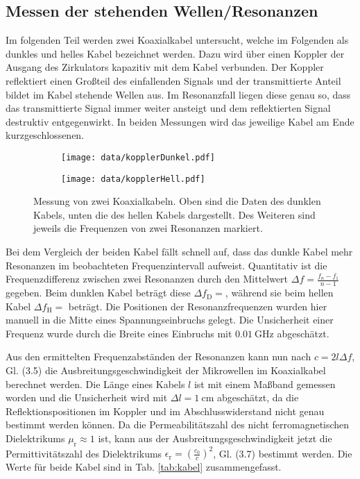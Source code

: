\subsection{Messen der stehenden Wellen/Resonanzen}
	Im folgenden Teil werden zwei Koaxialkabel untersucht, welche im Folgenden als dunkles und helles Kabel bezeichnet werden.
	Dazu wird über einen Koppler der Ausgang des Zirkulators kapazitiv mit dem Kabel verbunden.
	Der Koppler reflektiert einen Großteil des einfallenden Signals und der transmittierte Anteil bildet im Kabel stehende Wellen aus.
	Im Resonanzfall liegen diese genau so, dass das transmittierte Signal immer weiter ansteigt und dem reflektierten Signal destruktiv entgegenwirkt.
	In beiden Messungen wird das jeweilige Kabel am Ende kurzgeschlossenen.
	
	\begin{figure}[H]
		\centering
		\begin{subfigure}[c]{\textwidth}		
			\centering	
			\texttt{[image: data/kopplerDunkel.pdf]}
			\subcaption{}		
		\end{subfigure}
		
		\begin{subfigure}[c]{\textwidth}
			\centering
			\texttt{[image: data/kopplerHell.pdf]}
			\subcaption{}
		\end{subfigure}
		
		\caption{Messung von zwei Koaxialkabeln. Oben sind die Daten des dunklen Kabels, unten die des hellen Kabels dargestellt. Des Weiteren sind jeweils die Frequenzen von zwei Resonanzen markiert.}
		\label{fig:resonanz}
	\end{figure}

	Bei dem Vergleich der beiden Kabel fällt schnell auf, dass das dunkle Kabel mehr Resonanzen im beobachteten Frequenzintervall aufweist.
	Quantitativ ist die Frequenzdifferenz zwischen zwei Resonanzen durch den Mittelwert $\Delta f = \frac{f_n - f_1}{n-1}$ gegeben.
	Beim dunklen Kabel beträgt diese $\Delta f_\text{D} = $, während sie beim hellen Kabel $\Delta f_\text{H} = $ beträgt.
	Die Positionen der Resonanzfrequenzen wurden hier manuell in die Mitte eines Spannungseinbruchs gelegt.
	Die Unsicherheit einer Frequenz wurde durch die Breite eines Einbruchs mit $\SI{0,01}{\giga\hertz}$ abgeschätzt.
	
	Aus den ermittelten Frequenzabständen der Resonanzen kann nun nach $c = 2 l \Delta f$, Gl. (3.5) \cite{wwu} die Ausbreitungsgeschwindigkeit der Mikrowellen im Koaxialkabel berechnet werden.
	Die Länge eines Kabels $l$ ist mit einem Maßband gemessen worden und die Unsicherheit wird mit $\Delta l = \SI{1}{\centi\meter}$ abgeschätzt, da die Reflektionspositionen im Koppler und im Abschlusswiderstand nicht genau bestimmt werden können.
	Da die Permeabilitätszahl des nicht ferromagnetischen Dielektrikums $\mu_\text{r} \approx 1$ ist, kann aus der Ausbreitungsgeschwindigkeit jetzt die Permittivitätszahl des Dielektrikums $\epsilon_\text{r} = \left( \frac{c_0}{c} \right) ^2$, Gl. (3.7) \cite{wwu} bestimmt werden.
	Die Werte für beide Kabel sind in Tab. \ref{tab:kabel} zusammengefasst.
	
